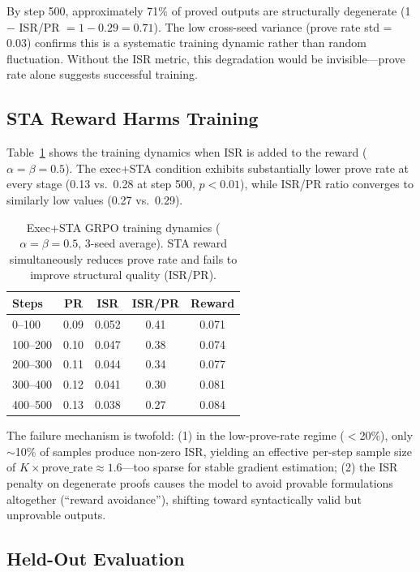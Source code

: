 \documentclass[11pt,a4paper]{article}
\begin{document}
By step 500, approximately 71\% of proved outputs are structurally degenerate (1 $-$ ISR/PR $= 1 - 0.29 = 0.71$).
The low cross-seed variance (prove rate std = 0.03) confirms this is a systematic training dynamic rather than random fluctuation.
Without the ISR metric, this degradation would be invisible---prove rate alone suggests successful training.

\subsection{STA Reward Harms Training}
\label{sec:sta-reward}

Table~\ref{tab:sta-reward} shows the training dynamics when ISR is added to the reward ($\alpha = \beta = 0.5$).
The exec+STA condition exhibits substantially lower prove rate at every stage (0.13 vs.\ 0.28 at step 500, $p < 0.01$), while ISR/PR ratio converges to similarly low values (0.27 vs.\ 0.29).

\begin{table}[t]
\centering
\small
\begin{tabular}{lcccc}
\toprule
\textbf{Steps} & \textbf{PR} & \textbf{ISR} & \textbf{ISR/PR} & \textbf{Reward} \\
\midrule
0--100   & 0.09 & 0.052 & 0.41 & 0.071 \\
100--200 & 0.10 & 0.047 & 0.38 & 0.074 \\
200--300 & 0.11 & 0.044 & 0.34 & 0.077 \\
300--400 & 0.12 & 0.041 & 0.30 & 0.081 \\
400--500 & 0.13 & 0.038 & 0.27 & 0.084 \\
\bottomrule
\end{tabular}
\caption{Exec+STA GRPO training dynamics ($\alpha = \beta = 0.5$, 3-seed average). STA reward simultaneously reduces prove rate and fails to improve structural quality (ISR/PR).}
\label{tab:sta-reward}
\end{table}

The failure mechanism is twofold: (1) in the low-prove-rate regime ($<$20\%), only $\sim$10\% of samples produce non-zero ISR, yielding an effective per-step sample size of $K \times \text{prove\_rate} \approx 1.6$---too sparse for stable gradient estimation; (2) the ISR penalty on degenerate proofs causes the model to avoid provable formulations altogether (``reward avoidance''), shifting toward syntactically valid but unprovable outputs.

\subsection{Held-Out Evaluation}
\label{sec:held-out}
\end{document}
